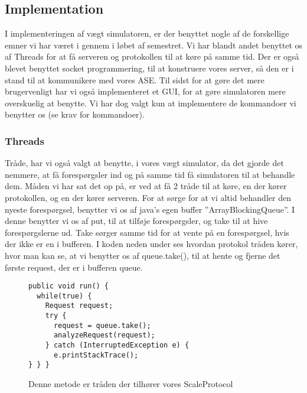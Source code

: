 \documentclass[a4paper]{article}
\begin{document}


\subsection{Implementation} %

I implementeringen af vægt simulatoren, er der benyttet nogle af de forskellige emner vi har været i gennem i løbet af semestret. Vi har blandt andet benyttet os af Threads for at få serveren og protokollen til at køre på samme tid. Der er også blevet benyttet socket programmering, til at konstruere vores server, så den er i stand til at kommunikere med vores ASE. Til sidst for at gøre det mere brugervenligt har vi også implementeret et GUI, for at gøre simulatoren mere overskuelig at benytte. Vi har dog valgt kun at implementere de kommandoer vi benytter os (se krav for kommandoer).

\subsubsection{Threads} %

Tråde, har vi også valgt at benytte, i vores vægt simulator, da det gjorde det nemmere, at få forespørgsler ind og på samme tid få simulatoren til at behandle dem. Måden vi har sat det op på, er ved at få 2 tråde til at køre, en der kører protokollen, og en der kører serveren. For at sørge for at vi altid behandler den nyeste forespørgsel, benytter vi os af java’s egen buffer ”ArrayBlockingQueue”. I denne benytter vi os af put, til at tilføje forespørgsler, og take til at hive forespørgslerne ud. Take sørger samme tid for at vente på en forespørgsel, hvis der ikke er en i bufferen. I koden neden under ses hvordan protokol tråden kører, hvor man kan se, at vi benytter os af queue.take(), til at hente og fjerne det første request, der er i bufferen queue.

\begin{figure}[h!]
\begin{lstlisting}
public void run() {
  while(true) {
    Request request;
    try {
      request = queue.take();
      analyzeRequest(request);
    } catch (InterruptedException e) {
      e.printStackTrace();
} } }
\end{lstlisting}
  \caption{Denne metode er tråden der tilhører vores ScaleProtocol}
\end{figure}

\end{document}
